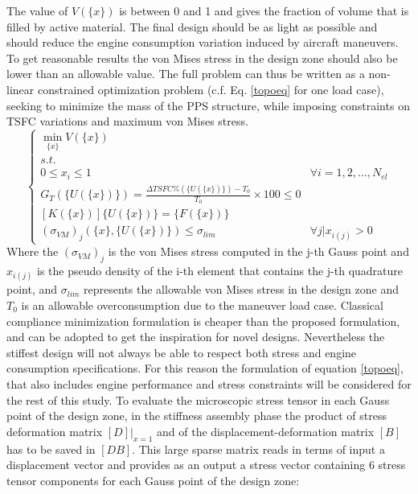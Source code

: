  The value of $V\left(\lbrace x\rbrace\right)$ is between 0 and 1 and gives the fraction of volume that is filled by active material.
 The final design should be as light as possible and should reduce the engine consumption variation induced by aircraft maneuvers.   
 To get reasonable results the von Mises stress in the design zone should also be lower than an allowable value.
 The full problem can thus be written as a non-linear constrained optimization problem (c.f. Eq. \ref{topoeq} for one load case), seeking to minimize the mass of the PPS structure, while imposing constraints on TSFC variations and maximum von Mises stress.
 \begin{equation}
 \label{topoeq}
 \left\lbrace\begin{array}{cc}
 \underset{\lbrace x\rbrace}{\min} V\left(\lbrace x\rbrace\right)& \\
 s.t. & \\ 0\leq x_i \leq 1  & \forall i=1,2,\dots,N_{el}\\
 G_T\left(\lbrace U\left(\lbrace x\rbrace\right)\rbrace\right)=\frac{\Delta TSFC \%\left(\lbrace U\left(\lbrace x\rbrace\right)\rbrace\right)-T_0}{T_0}\times 100 \leq 0 & \\
 \left[K\left(\lbrace x\rbrace\right)\right]\lbrace U \left(\lbrace x\rbrace\right) \rbrace = \lbrace F \left(\lbrace x\rbrace\right)\rbrace & \\
 (\sigma_{VM})_j\left(\lbrace x\rbrace,\lbrace U\left(\lbrace x\rbrace\right)\rbrace\right) \leq \sigma_{lim}  & \forall j| x_{i(j)}> 0
 \end{array}\right.
 \end{equation}
 Where the $(\sigma_{VM})_j$ is the von Mises stress computed in the j-th Gauss point and $x_{i(j)}$ is the pseudo density of the i-th element that contains the j-th quadrature point, and $\sigma_{lim}$ represents the allowable von Mises stress in the design zone and $T_0$ is an allowable overconsumption due to the maneuver load case. Classical compliance minimization formulation is cheaper than the proposed formulation, and can be adopted to get the inspiration for novel designs. Nevertheless the stiffest design will not always be able to respect both stress and engine consumption specifications. For this reason the formulation of equation \ref{topoeq}, that also includes engine performance and stress constraints will be considered for the rest of this study.
 To evaluate the microscopic stress tensor in each Gauss point of the design zone, in the stiffness assembly phase the product of stress deformation matrix $\left[D\right]|_{x=1}$ and of the displacement-deformation matrix $\left[B\right]$ has to be saved in  $\left[DB\right]$. This large sparse matrix reads in terms of input a displacement vector and provides as an output a stress vector containing 6 stress tensor components  for each Gauss point of the design zone:
